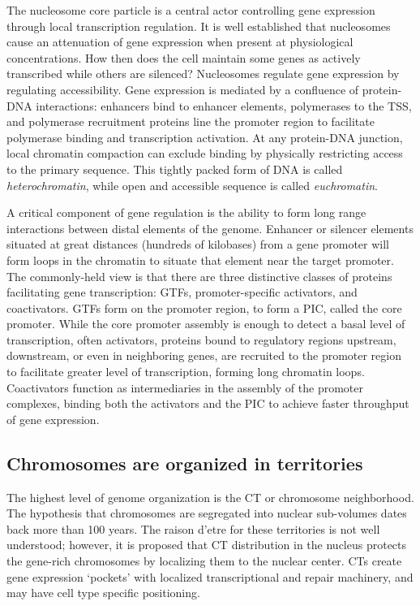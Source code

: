 The nucleosome core particle is a central actor controlling gene expression through local transcription regulation.  It is well established that nucleosomes
cause an attenuation of gene expression when present at physiological concentrations\cite{brown1984}\cite{lorch1987}\cite{laybourn1991}\cite{juan1994}. How
then does the cell maintain some genes as actively transcribed while others are silenced?  Nucleosomes regulate gene expression by regulating accessibility.
Gene expression is mediated by a confluence of protein-DNA interactions: enhancers bind to enhancer elements, polymerases to the \gls{TSS}, and polymerase
recruitment proteins line the promoter region to facilitate polymerase binding and transcription activation\cite{cox2008}.  At any protein-DNA junction,
local chromatin compaction can exclude binding by physically restricting access to the primary sequence.  This tightly packed form of DNA is called
\textit{\gls{heterochromatin}}, while open and accessible sequence is called \textit{\gls{euchromatin}}.

A critical component of gene regulation is the ability to form long range interactions between distal elements of the genome.  Enhancer or silencer elements
situated at great distances (hundreds of kilobases) from a gene promoter will form loops in the chromatin to situate that element near the target
promoter\cite{heintzman2007}.  The commonly-held view is that there are three distinctive classes of proteins facilitating gene transcription: \gls{GTFs},
promoter-specific activators, and coactivators\cite{manston2006}.  \gls{GTFs} form on the promoter region, to form a \gls{PIC}, called
the \gls{core promoter}.  While the \gls{core promoter} assembly is enough to detect a basal level of transcription, often activators, proteins bound
to regulatory regions upstream, downstream, or even in neighboring genes, are recruited to the promoter region to facilitate greater level of
transcription, forming long chromatin loops\cite{ptashne1997}.  Coactivators function as intermediaries in the assembly of the promoter complexes, binding
both the activators and the \gls{PIC} to achieve faster throughput of gene expression\cite{manston2006}.

\subsection*{Chromosomes are organized in territories}

The highest level of genome organization is the \gls{CT} or chromosome neighborhood\cite{cremer2001}.  The hypothesis that chromosomes are segregated into
nuclear sub-volumes dates back more than 100 years\cite{cremer1993}.  The raison d'etre for these territories is not well understood; however, it is proposed
that \gls{CT} distribution in the nucleus protects the gene-rich chromosomes by localizing them to the nuclear center\cite{boyle2001}\cite{federico2006}.
\gls{CTs} create gene expression `pockets' with localized transcriptional and repair machinery\cite{bolzer2005}, and may have cell type specific positioning.

